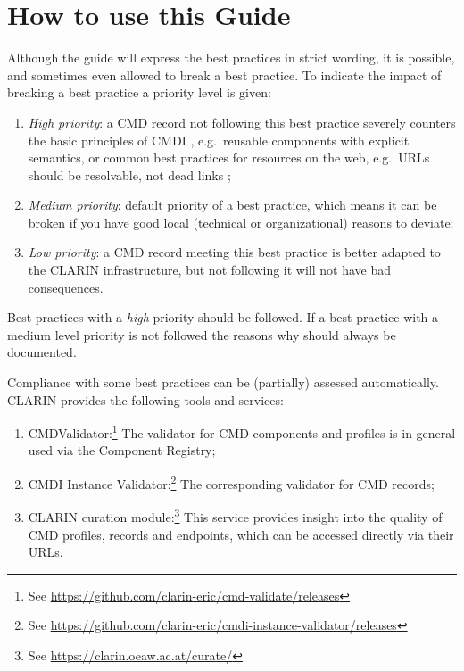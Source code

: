 \section{How to use this Guide}\label{howto}

Although the guide will express the best practices in strict wording, it is possible, and sometimes even allowed to break a best practice. To indicate the impact of breaking a best practice a priority level is given:

\begin{enumerate}
\def\labelenumi{\arabic{enumi}.}
\tightlist
\item
  \emph{High priority}: a CMD record not following this best practice severely counters the basic principles of CMDI , e.g.~reusable components with explicit semantics, or common best practices for resources on the web, e.g.~URLs should be resolvable, not dead links ;
\item
  \emph{Medium priority}: default priority of a best practice, which means it can be broken if you have good local (technical or organizational) reasons to deviate;
\item
  \emph{Low priority}: a CMD record meeting this best practice is better adapted to the CLARIN infrastructure, but not following it will not have bad consequences.
\end{enumerate}

Best practices with a \emph{high} priority should be followed. If a best practice with a medium level priority is not followed the reasons why should always be documented.

Compliance with some best practices can be (partially) assessed
automatically. CLARIN provides the following tools and services:

\begin{enumerate}
\def\labelenumi{\arabic{enumi}.}
\tightlist
\item
  CMDValidator:\footnote{See
    \url{https://github.com/clarin-eric/cmd-validate/releases}} The validator for CMD components and profiles is in general used via the Component Registry;
\item
  CMDI Instance Validator:\footnote{See
    \url{https://github.com/clarin-eric/cmdi-instance-validator/releases}}
  The corresponding validator for CMD records;
\item
  CLARIN curation module:\footnote{See
    \url{https://clarin.oeaw.ac.at/curate/}} This service provides insight into the quality of CMD profiles, records and endpoints, which can be accessed directly via their URLs.
\end{enumerate}

